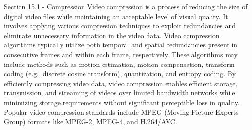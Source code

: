 \begin{notes}{Section 15.1 - Compression}
    Video compression is a process of reducing the size of digital video files while maintaining an acceptable level of visual quality. It involves applying various compression techniques to exploit 
    redundancies and eliminate unnecessary information in the video data. Video compression algorithms typically utilize both temporal and spatial redundancies present in consecutive frames and within each 
    frame, respectively. These algorithms may include methods such as motion estimation, motion compensation, transform coding (e.g., discrete cosine transform), quantization, and entropy coding. By efficiently 
    compressing video data, video compression enables efficient storage, transmission, and streaming of videos over limited bandwidth networks while minimizing storage requirements without significant 
    perceptible loss in quality. Popular video compression standards include MPEG (Moving Picture Experts Group) formats like MPEG-2, MPEG-4, and H.264/AVC.
\end{notes}

